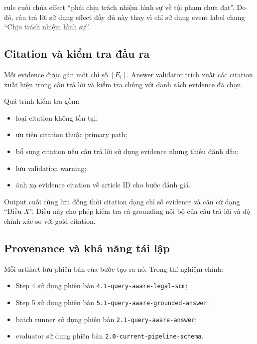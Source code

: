 rule cuối chứa effect ``phải chịu trách nhiệm hình sự về tội phạm chưa đạt''.
Do đó, câu trả lời sử dụng effect đầy đủ này thay vì chỉ sử dụng event label
chung ``Chịu trách nhiệm hình sự''.

\subsection{Citation và kiểm tra đầu ra}

Mỗi evidence được gán một chỉ số \([E_i]\). Answer validator trích xuất các
citation xuất hiện trong câu trả lời và kiểm tra chúng với danh sách evidence
đã chọn.

Quá trình kiểm tra gồm:

\begin{itemize}
    \item loại citation không tồn tại;
    \item ưu tiên citation thuộc primary path;
    \item bổ sung citation nếu câu trả lời sử dụng evidence nhưng thiếu đánh
    dấu;
    \item lưu validation warning;
    \item ánh xạ evidence citation về article ID cho bước đánh giá.
\end{itemize}

Output cuối cùng lưu đồng thời citation dạng chỉ số evidence và căn cứ dạng
``Điều \(X\)''. Điều này cho phép kiểm tra cả grounding nội bộ của câu trả
lời và độ chính xác so với gold citation.

\subsection{Provenance và khả năng tái lập}

Mỗi artifact lưu phiên bản của bước tạo ra nó. Trong thí nghiệm chính:

\begin{itemize}
    \item Step 4 sử dụng phiên bản
    \texttt{4.1-query-aware-legal-scm};

    \item Step 5 sử dụng phiên bản
    \texttt{5.1-query-aware-grounded-answer};

    \item batch runner sử dụng phiên bản
    \texttt{2.1-query-aware-answer};

    \item evaluator sử dụng phiên bản
    \texttt{2.0-current-pipeline-schema}.
\end{itemize}

